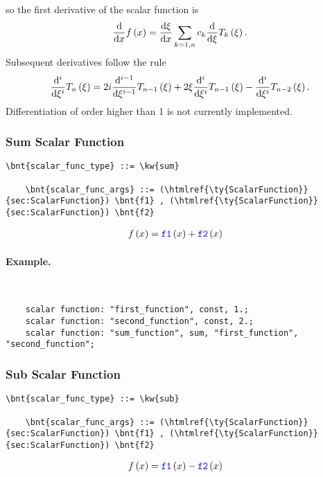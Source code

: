 so the first derivative of the scalar function is
\begin{equation}
	\frac{\mathrm{d}}{\mathrm{d}x}f\left( x \right) = \frac{\mathrm{d}\xi}{\mathrm{d}x} \sum_{k=1,n} c_k \frac{\mathrm{d}}{\mathrm{d}\xi} T_k\left( \xi \right) .
\end{equation}
Subsequent derivatives follow the rule
\begin{equation}
	\frac{\mathrm{d}^i}{\mathrm{d}\xi^i}T_n\left( \xi \right) = 
		2 i \frac{\mathrm{d}^{i-1}}{\mathrm{d}\xi^{i-1}}T_{n-1}\left( \xi \right)
		+ 2 \xi \frac{\mathrm{d}^i}{\mathrm{d}\xi^i}T_{n-1}\left( \xi \right)
		- \frac{\mathrm{d}^i}{\mathrm{d}\xi^i}T_{n-2}\left( \xi \right) .
\end{equation}
Differentiation of order higher than 1 is not currently implemented.




\subsubsection{Sum Scalar Function}
\begin{Verbatim}[commandchars=\\\{\}]
    \bnt{scalar_func_type} ::= \kw{sum}

    \bnt{scalar_func_args} ::= (\htmlref{\ty{ScalarFunction}}{sec:ScalarFunction}) \bnt{f1} , (\htmlref{\ty{ScalarFunction}}{sec:ScalarFunction}) \bnt{f2}
\end{Verbatim}
\begin{align}
	f\left( x \right)
	&=
	\textcolor{blue}{\texttt{f1}}\left( x \right) + \textcolor{blue}{\texttt{f2}}\left( x \right)
\end{align}

\paragraph{Example.} \
\begin{verbatim}
    scalar function: "first_function", const, 1.;
    scalar function: "second_function", const, 2.;
    scalar function: "sum_function", sum, "first_function", "second_function";
\end{verbatim}


\subsubsection{Sub Scalar Function}
\begin{Verbatim}[commandchars=\\\{\}]
    \bnt{scalar_func_type} ::= \kw{sub}

    \bnt{scalar_func_args} ::= (\htmlref{\ty{ScalarFunction}}{sec:ScalarFunction}) \bnt{f1} , (\htmlref{\ty{ScalarFunction}}{sec:ScalarFunction}) \bnt{f2}
\end{Verbatim}
\begin{align}
	f\left( x \right)
	&=
	\textcolor{blue}{\texttt{f1}}\left( x \right) - \textcolor{blue}{\texttt{f2}}\left( x \right)
\end{align}

